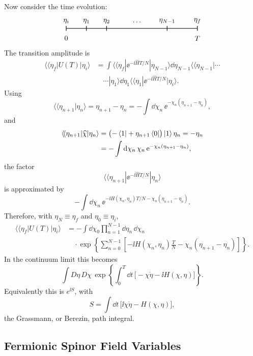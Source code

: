 Now consider the time evolution:
\[
\begin{tikzpicture}[baseline=(current bounding box.center),>=Stealth]
  \draw[thick] (0,0) -- (6.5,0);
  \foreach \x/\lab in {0/\eta_i,1/\eta_1,2/\eta_2,5/\eta_{N-1},6.5/\eta_f}
    {
      \draw[thick] (\x,-0.12) -- (\x,0.12);
      \node[above] at (\x,0.12) {\(\lab\)};
    }
  \node[above] at (3.5,0.1) {\(\cdots\)};
  \node[below] at (0,-0.25) {\(0\)};
  \node[below] at (6.5,-0.25) {\(T\)};
\end{tikzpicture}
\]
The transition amplitude is
\[
\begin{aligned}
  \langle\!\langle\eta_f|U(T)|\eta_i\rangle
  &=
  \int
  \langle\!\langle\eta_f|
  \ee^{-\ii\widehat H T/N}
  |\eta_{N-1}\rangle
  \dd\eta_{N-1}
  \langle\!\langle\eta_{N-1}|\cdots
  \\
  &\quad\cdots
  |\eta_1\rangle\dd\eta_1
  \langle\!\langle\eta_1|
  \ee^{-\ii\widehat H T/N}
  |\eta_i\rangle.
\end{aligned}
\]
Using
\[
  \langle\!\langle\eta_{n+1}|\eta_n\rangle
  =
  \eta_{n+1}-\eta_n
  =
  -\int\dd\chi_n\,
  \ee^{-\chi_n(\eta_{n+1}-\eta_n)},
\]
and
\[
\begin{aligned}
  \langle\!\langle\eta_{n+1}|\widehat\chi|\eta_n\rangle
  &=
  \bigl(-\bra{1}+\eta_{n+1}\bra{0}\bigr)\ket{1}\eta_n
  =
  -\eta_n
  \\
  &=
  -\int\mathrm{d}\chi_n\,\chi_n\,
  \mathrm{e}^{-\chi_n(\eta_{n+1}-\eta_n)},
\end{aligned}
\]
the factor
\[
  \langle\!\langle\eta_{n+1}|
  \ee^{-\ii\widehat H T/N}
  |\eta_n\rangle
\]
is approximated by
\[
  -\int\dd\chi_n\,
  \ee^{-\ii H(\chi_n,\eta_n)T/N
  -\chi_n(\eta_{n+1}-\eta_n)}.
\]
Therefore, with \(\eta_N\equiv\eta_f\) and
\(\eta_0\equiv\eta_i\),
\[
\begin{aligned}
  \langle\!\langle\eta_f|U(T)|\eta_i\rangle
  &=
  -\int
  \dd\chi_0
  \prod_{n=1}^{N-1}\dd\eta_n\,\dd\chi_n\,
  \\
  &\quad\cdot
  \exp\left\{
    \sum_{n=0}^{N-1}
    \left[
      -\ii H(\chi_n,\eta_n)\frac{T}{N}
      -\chi_n(\eta_{n+1}-\eta_n)
    \right]
  \right\}.
\end{aligned}
\]
In the continuum limit this becomes
\[
  \int D\eta\,D\chi\,
  \exp\left\{
    \int_0^T\dd t\,
    \bigl[-\chi\dot\eta-\ii H(\chi,\eta)\bigr]
  \right\}.
\]
Equivalently this is \(e^{\ii S}\), with
\[
  S=\int\dd t\,\bigl[\ii\chi\dot\eta-H(\chi,\eta)\bigr],
\]
the Grassmann, or Berezin, path integral.

\subsection{Fermionic Spinor Field Variables}

